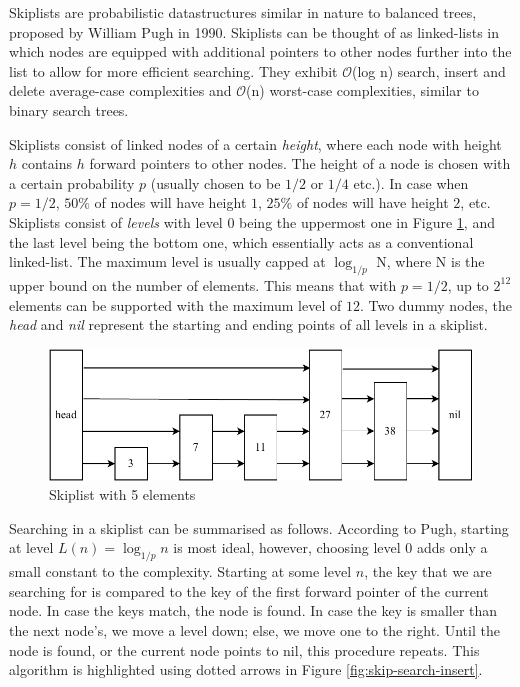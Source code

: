 Skiplists are probabilistic datastructures similar in nature to balanced trees, proposed by William Pugh in 1990\cite{pugh-skiplist}. Skiplists can be thought of as linked-lists in which nodes are equipped with additional pointers to other nodes further into the list to allow for more efficient searching. They exhibit $\mathcal{O}$(log n) search, insert and delete average-case complexities and $\mathcal{O}$(n) worst-case complexities, similar to binary search trees. 

Skiplists consist of linked nodes of a certain \textit{height}, where each node with height $h$ contains $h$ forward pointers to other nodes. The height of a node is chosen with a certain probability $p$ (usually chosen to be $1/2$ or $1/4$ etc.). In case when $p = 1/2$, $50\%$ of nodes will have height $1$, $25\%$ of nodes will have height $2$, etc. Skiplists consist of \textit{levels} with level $0$ being the uppermost one in Figure \ref{fig:skiplist}, and the last level being the bottom one, which essentially acts as a conventional linked-list. The maximum level is usually capped at $\log_{1/p}$ N, where N is the upper bound on the number of elements. This means that with $p = 1/2$, up to $2^{12}$ elements can be supported with the maximum level of $12$\cite{pugh-skiplist}. Two dummy nodes, the \textit{head} and \textit{nil} represent the starting and ending points of all levels in a skiplist.

\begin{figure}[!htb]
    \centering
    \includegraphics[width=.9\textwidth]{images/skiplist.pdf}
    \caption{Skiplist with 5 elements}
    \label{fig:skiplist}
\end{figure}

Searching in a skiplist can be summarised as follows. According to Pugh, starting at level $L(n) = \log_{1/p} n$ is most ideal, however, choosing level $0$ adds only a small constant to the complexity\cite{pugh-skiplist}. Starting at some level $n$, the key that we are searching for is compared to the key of the first forward pointer of the current node. In case the keys match, the node is found. In case the key is smaller than the next node's, we move a level down; else, we move one to the right. Until the node is found, or the current node points to nil, this procedure repeats. This algorithm is highlighted using dotted arrows in Figure \ref{fig:skip-search-insert}. 

